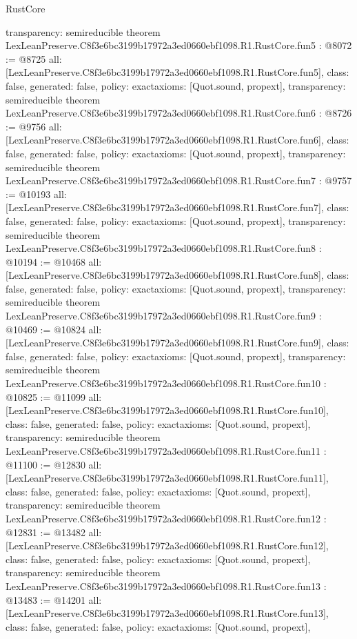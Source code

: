 \begin{lexlean}{RustCore}
\begin{coremodule}
{  transparency: semireducible
}
theorem LexLeanPreserve.C8f3e6bc3199b17972a3ed0660ebf1098.R1.RustCore.fun5 : @8072 := @8725 {
  all: [LexLeanPreserve.C8f3e6bc3199b17972a3ed0660ebf1098.R1.RustCore.fun5],
  class: false,
  generated: false,
  policy: exact{axioms: [Quot.sound, propext]},
  transparency: semireducible
}
theorem LexLeanPreserve.C8f3e6bc3199b17972a3ed0660ebf1098.R1.RustCore.fun6 : @8726 := @9756 {
  all: [LexLeanPreserve.C8f3e6bc3199b17972a3ed0660ebf1098.R1.RustCore.fun6],
  class: false,
  generated: false,
  policy: exact{axioms: [Quot.sound, propext]},
  transparency: semireducible
}
theorem LexLeanPreserve.C8f3e6bc3199b17972a3ed0660ebf1098.R1.RustCore.fun7 : @9757 := @10193 {
  all: [LexLeanPreserve.C8f3e6bc3199b17972a3ed0660ebf1098.R1.RustCore.fun7],
  class: false,
  generated: false,
  policy: exact{axioms: [Quot.sound, propext]},
  transparency: semireducible
}
theorem LexLeanPreserve.C8f3e6bc3199b17972a3ed0660ebf1098.R1.RustCore.fun8 : @10194 := @10468 {
  all: [LexLeanPreserve.C8f3e6bc3199b17972a3ed0660ebf1098.R1.RustCore.fun8],
  class: false,
  generated: false,
  policy: exact{axioms: [Quot.sound, propext]},
  transparency: semireducible
}
theorem LexLeanPreserve.C8f3e6bc3199b17972a3ed0660ebf1098.R1.RustCore.fun9 : @10469 := @10824 {
  all: [LexLeanPreserve.C8f3e6bc3199b17972a3ed0660ebf1098.R1.RustCore.fun9],
  class: false,
  generated: false,
  policy: exact{axioms: [Quot.sound, propext]},
  transparency: semireducible
}
theorem LexLeanPreserve.C8f3e6bc3199b17972a3ed0660ebf1098.R1.RustCore.fun10 : @10825 := @11099 {
  all: [LexLeanPreserve.C8f3e6bc3199b17972a3ed0660ebf1098.R1.RustCore.fun10],
  class: false,
  generated: false,
  policy: exact{axioms: [Quot.sound, propext]},
  transparency: semireducible
}
theorem LexLeanPreserve.C8f3e6bc3199b17972a3ed0660ebf1098.R1.RustCore.fun11 : @11100 := @12830 {
  all: [LexLeanPreserve.C8f3e6bc3199b17972a3ed0660ebf1098.R1.RustCore.fun11],
  class: false,
  generated: false,
  policy: exact{axioms: [Quot.sound, propext]},
  transparency: semireducible
}
theorem LexLeanPreserve.C8f3e6bc3199b17972a3ed0660ebf1098.R1.RustCore.fun12 : @12831 := @13482 {
  all: [LexLeanPreserve.C8f3e6bc3199b17972a3ed0660ebf1098.R1.RustCore.fun12],
  class: false,
  generated: false,
  policy: exact{axioms: [Quot.sound, propext]},
  transparency: semireducible
}
theorem LexLeanPreserve.C8f3e6bc3199b17972a3ed0660ebf1098.R1.RustCore.fun13 : @13483 := @14201 {
  all: [LexLeanPreserve.C8f3e6bc3199b17972a3ed0660ebf1098.R1.RustCore.fun13],
  class: false,
  generated: false,
  policy: exact{axioms: [Quot.sound, propext]},
}
\end{coremodule}
\end{lexlean}
